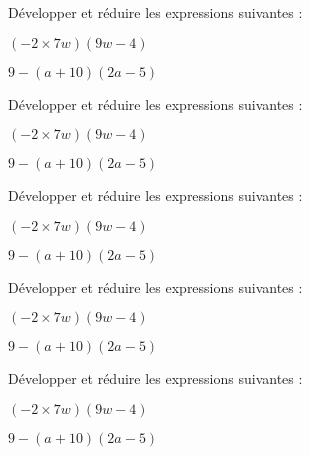 \documentclass{exos}
\begin{document}
\begin{exercize*}
Développer et réduire les expressions suivantes :
\begin{alphaquestions}
\item $(-2 \times 7w)(9w - 4)$ 
\item $9 - (a + 10)(2a - 5)$
\end{alphaquestions}
\end{exercize*}
\vspace*{2cm}
\begin{exercize*}
Développer et réduire les expressions suivantes :
\begin{alphaquestions}
\item $(-2 \times 7w)(9w - 4)$ 
\item $9 - (a + 10)(2a - 5)$
\end{alphaquestions}
\end{exercize*}
\vspace*{2cm}
\begin{exercize*}
Développer et réduire les expressions suivantes :
\begin{alphaquestions}
\item $(-2 \times 7w)(9w - 4)$ 
\item $9 - (a + 10)(2a - 5)$
\end{alphaquestions}
\end{exercize*}
\vspace*{2cm}
\begin{exercize*}
Développer et réduire les expressions suivantes :
\begin{alphaquestions}
\item $(-2 \times 7w)(9w - 4)$ 
\item $9 - (a + 10)(2a - 5)$
\end{alphaquestions}
\end{exercize*}
\vspace*{2cm}
\begin{exercize*}
Développer et réduire les expressions suivantes :
\begin{alphaquestions}
\item $(-2 \times 7w)(9w - 4)$ 
\item $9 - (a + 10)(2a - 5)$
\end{alphaquestions}
\end{exercize*}
\end{document}
